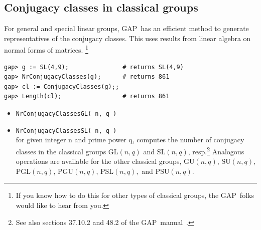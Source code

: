 \documentclass[11pt]{amsart}
\newcommand{\gap}{GAP}   %
\theoremstyle{plain}
\newcommand{\codesize}{\footnotesize}
\newcommand{\<}{\ensuremath{\langle}}
\renewcommand{\>}{\ensuremath{\rangle}}
\newcommand{\GL}{\ensuremath{\mathrm{GL}}}
\newcommand{\SL}{\ensuremath{\mathrm{SL}}}
\newcommand{\GU}{\ensuremath{\mathrm{GU}}}
\newcommand{\SU}{\ensuremath{\mathrm{SU}}}
\newcommand{\PGL}{\ensuremath{\mathrm{PGL}}}
\newcommand{\PGU}{\ensuremath{\mathrm{PGU}}}
\newcommand{\PSL}{\ensuremath{\mathrm{PSL}}}
\newcommand{\PSU}{\ensuremath{\mathrm{PSU}}}
\begin{document}
\subsection{Conjugacy classes in classical groups}
For general and special linear groups, \gap\ has an efficient method to generate
representatives of the conjugacy classes. This uses results from linear algebra on normal forms of matrices.
\footnote{If you know how to do this for other types of classical groups, the \gap\
  folks would like to hear from you.}
{\codesize
\begin{verbatim}
gap> g := SL(4,9);               # returns SL(4,9)
gap> NrConjugacyClasses(g);      # returns 861
gap> cl := ConjugacyClasses(g);;
gap> Length(cl);                 # returns 861
\end{verbatim}}
  \begin{itemize}
\item {\tt NrConjugacyClassesGL( n, q )}
\item {\tt NrConjugacyClassesSL( n, q )}\\
for given integer n and prime power q, computes the number of conjugacy classes in
the classical groups $\GL(n, q)$ and $\SL(n, q)$, resp.\footnote{See also sections
  37.10.2 and 48.2 of the \gap\ manual~\cite{gapmanual}.}
Analogous operations are available for the other classical groups,
$\GU(n, q)$, $\SU(n, q)$, $\PGL(n, q)$, $\PGU(n, q)$, $\PSL(n, q),$ and $\PSU(n, q)$.
 \end{itemize}
\newpage
\end{document}
